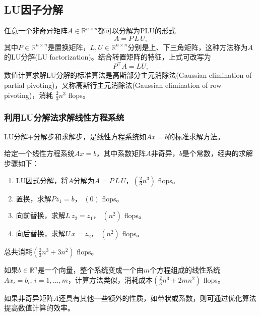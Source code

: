 \subsection{LU因子分解}
\label{sec:numlin-factorization-lu}
任意一个非奇异矩阵$A \in \mathbb{R}^{n \times n}$都可以分解为PLU的形式
\begin{equation}
  A = P \, L \, U,
\end{equation}
其中$P \in \mathbb{R}^{n \times n}$是置换矩阵，$L, U \in \mathbb{R}^{n \times n}$分别是上、下三角矩阵，这种方法称为$A$的LU分解(LU factorization)。结合转置矩阵的特征，上式可改写为
\begin{equation}
  \label{eq:numlin-factorization-lu}
  P^{\top} A = LU,
\end{equation}
数值计算求解LU分解的标准算法是高斯部分主元消除法(Gaussian elimination of partial pivoting)，又称高斯行主元消除法(Gaussian elimination of row pivoting)，消耗 $\frac{2}{3} n^{3}$ flops。

\subsubsection{利用LU分解法求解线性方程系统}
LU分解+分解步和求解步，是线性方程系统如$Ax=b$的标准求解方法。
\begin{algorithm}[利用LU分解法求解线性方程系统]
  \label{algorithm:numlin-factorization-lu}
  给定一个线性方程系统$Ax=b$，其中系数矩阵$A$非奇异，$b$是个常数，经典的求解步骤如下：
  \begin{enumerate}
    \item LU因式分解，将$A$分解为$A = P \, L \, U$，$\left( \frac{2}{3} n^{3} \right)$ flops。
    \item 置换，求解$P z_{1} = b$， $(0)$ flops。
    \item 向前替换，求解$L \, z_{2} = z_{1}$， $\left( n^{2} \right)$ flops。
    \item 向后替换，求解$U \, x = z_{2}$， $ \left( n^{2} \right)$ flops。
  \end{enumerate}

  总共消耗$\left( \frac{2}{3} n^{3} + 3 n^{2} \right)$ flops。
\end{algorithm}

如果$b \in \mathbb{R}^{n}$是一个向量，整个系统变成一个由$m$个方程组成的线性系统$A x_{i} = b_{i}, \, i = 1,\ldots,m$，计算方法类似，消耗成本$\left( \frac{2}{3} n^{3} + 2 m n^{2} \right)$ flops。

如果非奇异矩阵$A$还具有其他一些额外的性质，如带状或系数，则可通过优化算法提高数值计算的效率。

